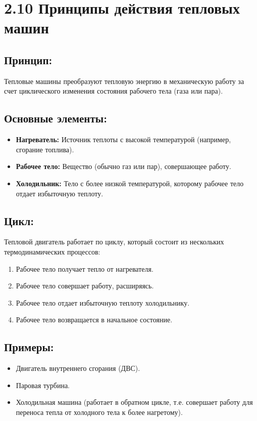 \documentclass[a4paper,12pt]{article}
\begin{document}
\section*{2.10 Принципы действия тепловых машин}

\vspace{-9pt}
\subsection*{Принцип:}
\vspace{-3pt}
Тепловые машины преобразуют тепловую энергию в механическую работу за счет циклического изменения состояния рабочего тела (газа или пара).

\vspace{-9pt}
\subsection*{Основные элементы:}
\vspace{-3pt}
\begin{itemize}
    \item \textbf{Нагреватель:} Источник теплоты с высокой температурой (например, сгорание топлива).
    \item \textbf{Рабочее тело:} Вещество (обычно газ или пар), совершающее работу.
    \item \textbf{Холодильник:} Тело с более низкой температурой, которому рабочее тело отдает избыточную теплоту.
\end{itemize}
\newpage
\vspace{-9pt}
\subsection*{Цикл:}
\vspace{-3pt}
Тепловой двигатель работает по циклу, который состоит из нескольких термодинамических процессов:
\begin{enumerate}[itemsep=0pt, topsep=0pt, parsep=3pt]
    \item Рабочее тело получает тепло от нагревателя.
    \item Рабочее тело совершает работу, расширяясь.
    \item Рабочее тело отдает избыточную теплоту холодильнику.
    \item Рабочее тело возвращается в начальное состояние.
\end{enumerate}

\vspace{-9pt}
\subsection*{Примеры:}
\vspace{-3pt}
\begin{itemize}
    \item Двигатель внутреннего сгорания (ДВС).
    \item Паровая турбина.
    \item Холодильная машина (работает в обратном цикле, т.е. совершает работу для переноса тепла от холодного тела к более нагретому).
\end{itemize}
\end{document}

